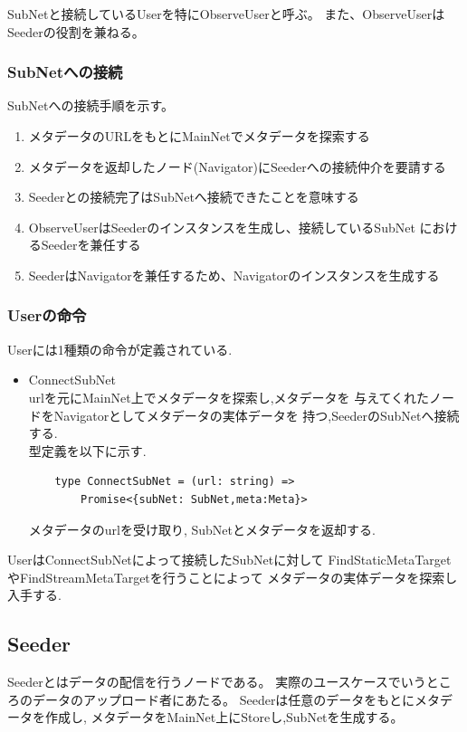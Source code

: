 \documentclass[sotsuron]{jcsie}
\begin{document}
SubNetと接続しているUserを特にObserveUserと呼ぶ。
また、ObserveUserはSeederの役割を兼ねる。

\subsubsection{SubNetへの接続}
SubNetへの接続手順を示す。
\begin{enumerate}
	\item メタデータのURLをもとにMainNetでメタデータを探索する
	\item メタデータを返却したノード(Navigator)にSeederへの接続仲介を要請する
	\item Seederとの接続完了はSubNetへ接続できたことを意味する
	\item 
	      ObserveUserはSeederのインスタンスを生成し、接続しているSubNet
	      におけるSeederを兼任する
	\item SeederはNavigatorを兼任するため、Navigatorのインスタンスを生成する
\end{enumerate}

\subsubsection{Userの命令}
Userには1種類の命令が定義されている.
\begin{itemize}
	\item {ConnectSubNet}\\
	      urlを元にMainNet上でメタデータを探索し,メタデータを
	      与えてくれたノードをNavigatorとしてメタデータの実体データを
	      持つ,SeederのSubNetへ接続する.\\
	      	      	      	      
	      型定義を以下に示す.
	      \begin{lstlisting}
	type ConnectSubNet = (url: string) =>
		Promise<{subNet: SubNet,meta:Meta}>
	      \end{lstlisting}
	      	      	      	      
	      メタデータのurlを受け取り,
	      SubNetとメタデータを返却する.		
\end{itemize}

UserはConnectSubNetによって接続したSubNetに対して
FindStaticMetaTargetやFindStreamMetaTargetを行うことによって
メタデータの実体データを探索し入手する.

\subsection{Seeder}
Seederとはデータの配信を行うノードである。
実際のユースケースでいうところのデータのアップロード者にあたる。
Seederは任意のデータをもとにメタデータを作成し,
メタデータをMainNet上にStoreし,SubNetを生成する。
\end{document}
